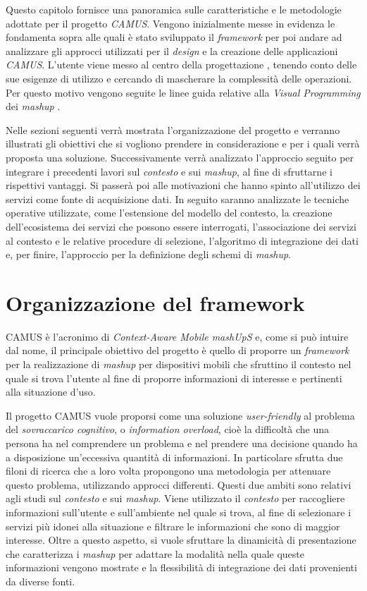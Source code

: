 Questo capitolo fornisce una panoramica sulle caratteristiche e le metodologie adottate per il progetto \emph{CAMUS}. Vengono inizialmente messe in evidenza le fondamenta sopra alle quali è stato sviluppato il \emph{framework} per poi andare ad analizzare gli approcci utilizzati per il \emph{design} e la creazione delle applicazioni \emph{CAMUS}. L'utente viene messo al centro della progettazione \cite{lieberman2006end}, tenendo conto delle sue esigenze di utilizzo e cercando di mascherare la complessità delle operazioni. Per questo motivo vengono seguite le linee guida relative alla \emph{Visual Programming} dei \emph{mashup} \cite{DBLP:journals/tweb/CappielloMP15}.

Nelle sezioni seguenti verrà mostrata l'organizzazione del progetto e verranno illustrati gli obiettivi che si vogliono prendere in considerazione e per i quali verrà proposta una soluzione. Successivamente verrà analizzato l'approccio seguito per integrare i precedenti lavori sul \emph{contesto} e sui \emph{mashup}, al fine di sfruttarne i rispettivi vantaggi. Si passerà poi alle motivazioni che hanno spinto all'utilizzo dei servizi come fonte di acquisizione dati. In seguito saranno analizzate le tecniche operative utilizzate, come l'estensione del modello del contesto, la creazione dell'ecosistema dei servizi che possono essere interrogati, l'associazione dei servizi al contesto e le relative procedure di selezione, l'algoritmo di integrazione dei dati e, per finire, l'approccio per la definizione degli schemi di \emph{mashup}.

\section{Organizzazione del framework\label{sec:panoramica-progetto}}

CAMUS è l'acronimo di \emph{Context-Aware Mobile mashUpS} e, come si può intuire dal nome, il principale obiettivo del progetto è quello di proporre un \emph{framework} per la realizzazione di \emph{mashup} per dispositivi mobili che sfruttino il contesto nel quale si trova l'utente al fine di proporre informazioni di interesse e pertinenti alla situazione d'uso.
 
 Il progetto CAMUS vuole proporsi come una soluzione \emph{user-friendly} al problema del \emph{sovraccarico cognitivo}, o \emph{information overload}, cioè la difficoltà che una persona ha nel comprendere un problema e nel prendere una decisione quando ha a disposizione un'eccessiva quantità di informazioni. In particolare sfrutta due filoni di ricerca che a loro volta propongono una metodologia per attenuare questo problema, utilizzando approcci differenti. Questi due ambiti sono relativi agli studi sul \emph{contesto} e sui \emph{mashup}. Viene utilizzato il \emph{contesto} per raccogliere informazioni sull'utente e sull'ambiente nel quale si trova, al fine di selezionare i servizi più idonei alla situazione e filtrare le informazioni che sono di maggior interesse. Oltre a questo aspetto, si vuole sfruttare la dinamicità di presentazione che caratterizza i \emph{mashup} per adattare la modalità nella quale queste informazioni vengono mostrate e la flessibilità di integrazione dei dati provenienti da diverse fonti.

